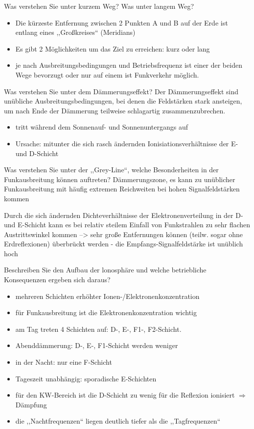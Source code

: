 \documentclass[avery5371,grid,frame,a4paper]{flashcards}
\newcommand{\card}[3]{
  \begin{flashcard}[{\chap} -- #1]{#2}#3\end{flashcard}
}
\begin{document}
\card{18}{Was verstehen Sie unter kurzem Weg? Was unter langem Weg?}{
  \begin{itemize}
    \item Die kürzeste Entfernung zwischen 2 Punkten A und B auf der Erde ist entlang eines ,,Großkreises`` (Meridians)
    \item Es gibt 2 Möglichkeiten um das Ziel zu erreichen:  kurz oder lang
    \item je nach Ausbreitungsbedingungen und Betriebsfrequenz ist einer der beiden Wege bevorzugt oder nur auf einem ist Funkverkehr möglich.
  \end{itemize}
}
\card{19}{Was verstehen Sie unter dem Dämmerungseffekt?}{
  Der Dämmerungseffekt sind unübliche Ausbreitungsbedingungen, bei denen die Feldstärken stark ansteigen, um nach Ende der Dämmerung teilweise schlagartig zusammenzubrechen.
  \begin{itemize}
    \item tritt während dem Sonnenauf- und Sonnenuntergangs auf
    \item Ursache: mitunter die sich rasch ändernden Ionisiationsverhältnisse der E- und D-Schicht
  \end{itemize}
}
\card{20}{Was verstehen Sie unter der ,,Grey-Line``, welche Besonderheiten in der Funkausbreitung können auftreten?}{
  Dämmerungszone, es kann zu unüblicher Funkausbreitung mit häufig extremen Reichweiten bei hohen Signalfeldstärken kommen

  Durch die sich ändernden Dichteverhältnisse der Elektronenverteilung in der D- und E-Schicht kann es bei relativ steilem Einfall von Funkstrahlen zu sehr flachen Austrittswinkel kommen --> sehr große Entfernungen können (teilw. sogar ohne Erdreflexionen) überbrückt werden - die Empfangs-Signalfeldstärke ist unüblich hoch
}
\card{21}{Beschreiben Sie den Aufbau der lonosphäre und welche betriebliche Konsequenzen ergeben sich daraus?}{
  \footnotesize
  \begin{minipage}{0.49\textwidth}
    \begin{itemize}
      \item mehreren Schichten erhöhter Ionen-/Elektronenkonzentration
      \item für Funkausbreitung ist die Elektronenkonzentration wichtig
      \item am Tag treten 4 Schichten auf: D-, E-, F1-, F2-Schicht.
      \item Abenddämmerung: D-, E-, F1-Schicht werden weniger
    \end{itemize}
  \end{minipage}
  \begin{minipage}{0.5\textwidth}
    \begin{itemize}
      \item in der Nacht: nur eine F-Schicht
      \item Tageszeit unabhängig: sporadische E-Schichten
      \item für den KW-Bereich ist die D-Schicht zu wenig für die Reflexion ionisiert $\Rightarrow$ Dämpfung
      \item die ,,Nachtfrequenzen`` liegen deutlich tiefer als die ,,Tagfrequenzen``
    \end{itemize}
  \end{minipage}
}
\end{document}

